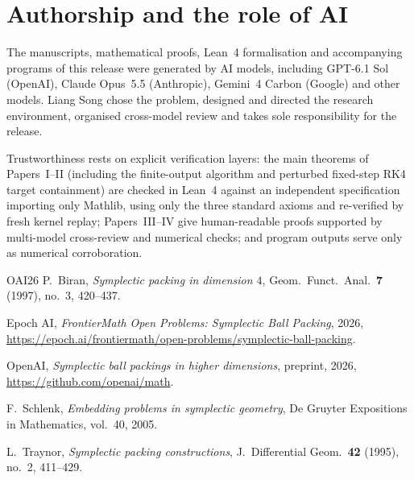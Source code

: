\documentclass[11pt]{amsart}
\begin{document}
\section*{Authorship and the role of AI}

The manuscripts, mathematical proofs, Lean~4 formalisation and accompanying programs of this release were generated by
AI models, including GPT-6.1 Sol (OpenAI), Claude Opus~5.5 (Anthropic), Gemini~4 Carbon (Google) and other models.
Liang Song chose the problem, designed and directed the research environment, organised cross-model review and takes
sole responsibility for the release.

Trustworthiness rests on explicit verification layers: the main theorems of Papers~I--II (including the finite-output
algorithm and perturbed fixed-step RK4 target containment) are checked in Lean~4 against an independent specification
importing only Mathlib, using only the three standard axioms and re-verified by fresh kernel replay; Papers~III--IV give
human-readable proofs supported by multi-model cross-review and numerical checks; and program outputs serve only as
numerical corroboration.

\begin{thebibliography}{OAI26}
P.~Biran, \emph{Symplectic packing in dimension $4$}, Geom.\ Funct.\ Anal.\ \textbf{7} (1997), no.~3, 420--437.

Epoch AI, \emph{FrontierMath Open Problems: Symplectic Ball Packing}, 2026,
\url{https://epoch.ai/frontiermath/open-problems/symplectic-ball-packing}.

OpenAI, \emph{Symplectic ball packings in higher dimensions}, preprint, 2026,
\url{https://github.com/openai/math}.

F.~Schlenk, \emph{Embedding problems in symplectic geometry}, De Gruyter Expositions in Mathematics, vol.~40, 2005.

L.~Traynor, \emph{Symplectic packing constructions}, J.\ Differential Geom.\ \textbf{42} (1995), no.~2, 411--429.
\end{thebibliography}
\end{document}
